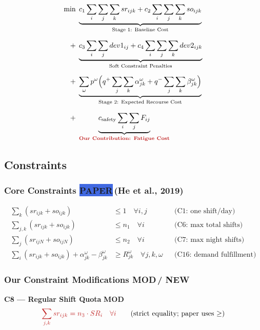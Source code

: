 \documentclass[12pt,a4paper]{article}
\newcommand{\newbadge}{\colorbox{accentgreen}{\tiny\color{white}\textbf{NEW}}\,}
\newcommand{\modbadge}{\colorbox{accentorange}{\tiny\color{white}\textbf{MOD}}\,}
\newcommand{\frombadge}{\colorbox{royalblue}{\tiny\color{white}\textbf{PAPER}}\,}
\begin{document}
\begin{eqbox}
\begin{align}
  \min\;
  &\underbrace{c_1 \sum_i\sum_j\sum_k sr_{ijk}
  + c_2 \sum_i\sum_j\sum_k so_{ijk}}_{\text{Stage 1: Baseline Cost}}
  \notag\\[6pt]
  +\;&\underbrace{c_3 \sum_i\sum_j dev1_{ij}
  + c_4 \sum_i\sum_j\sum_k dev2_{ijk}}_{\text{Soft Constraint Penalties}}
  \notag\\[6pt]
  +\;&\underbrace{\sum_{\omega} p^{\omega}
    \Bigl(q^{+}\sum_j\sum_k\alpha_{jk}^{\omega}
         +q^{-}\sum_j\sum_k\beta_{jk}^{\omega}\Bigr)
  }_{\text{Stage 2: Expected Recourse Cost}}
  \notag\\[6pt]
  +\;&\underbrace{c_{\text{safety}}\sum_i\sum_j F_{ij}
  }_{\textcolor{accentred}{\textbf{Our Contribution: Fatigue Cost}}}
\end{align}
\end{eqbox}

\subsection{Constraints}

\subsubsection{Core Constraints \frombadge (He et al., 2019)}

\begin{align}
  \sum_k (sr_{ijk}+so_{ijk}) &\leq 1 \quad \forall i,j
    && \text{(C1: one shift/day)}\\
  \sum_{j,k}(sr_{ijk}+so_{ijk}) &\leq n_1 \quad \forall i
    && \text{(C6: max total shifts)}\\
  \sum_j(sr_{ijN}+so_{ijN}) &\leq n_2 \quad \forall i
    && \text{(C7: max night shifts)}\\
  \sum_i(sr_{ijk}+so_{ijk})+\alpha_{jk}^{\omega}-\beta_{jk}^{\omega}
    &\geq R_{jk}^{\omega} \quad \forall j,k,\omega
    && \text{(C16: demand fulfillment)}
\end{align}

\subsubsection{Our Constraint Modifications \modbadge / \newbadge}

\begin{eqbox}
\textbf{C8 — Regular Shift Quota} \modbadge
\begin{equation}
  \textcolor{accentred}{\sum_{j,k} sr_{ijk} = n_3 \cdot SR_i \quad \forall i}
  \qquad\text{(strict equality; paper uses $\geq$)}
\end{equation}
\end{eqbox}
\end{document}
